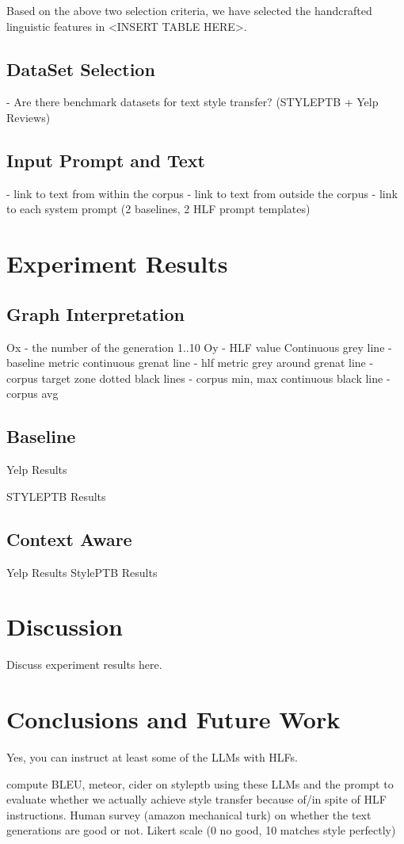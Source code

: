 \documentclass[runningheads,a4paper,11pt]{article}
\begin{document}
Based on the above two selection criteria, we have selected the handcrafted
linguistic features in <INSERT TABLE HERE>.

\subsection{DataSet Selection}\label{ds-selection}

- Are there benchmark datasets for text style transfer? (STYLEPTB + Yelp Reviews)

\subsection{Input Prompt and Text}\label{input-text}

- link to text from within the corpus
- link to text from outside the corpus
- link to each system prompt (2 baselines, 2 HLF prompt templates)

\section{Experiment Results}

\subsection{Graph Interpretation}

Ox - the number of the generation 1..10
Oy - HLF value
Continuous grey line - baseline metric
continuous grenat line - hlf metric
grey around grenat line - corpus target zone
dotted black lines - corpus min, max
continuous black line - corpus avg

\subsection{Baseline}

Yelp Results

STYLEPTB Results

\subsection{Context Aware}

Yelp Results
StylePTB Results

\section{Discussion}

Discuss experiment results here.

\section{Conclusions and Future Work}

Yes, you can instruct at least some of the LLMs with HLFs.

compute BLEU, meteor, cider on styleptb using these LLMs and the prompt to
evaluate whether we actually achieve style transfer because of/in spite of HLF
instructions.
Human survey (amazon mechanical turk) on whether the text generations are good
or not. Likert scale (0 no good, 10 matches style perfectly)



\end{document}
